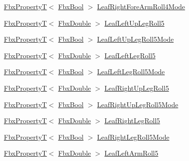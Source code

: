 \begin{DoxyCompactItemize}
\item 
\hyperlink{class_fbx_property_t}{Fbx\+PropertyT}$<$ \hyperlink{fbxtypes_8h_a92e0562b2fe33e76a242f498b362262e}{Fbx\+Bool} $>$ \hyperlink{class_fbx_character_a47514db9e67e2b8cf737977951edd431}{Leaf\+Right\+Fore\+Arm\+Roll4\+Mode}
\item 
\hyperlink{class_fbx_property_t}{Fbx\+PropertyT}$<$ \hyperlink{fbxtypes_8h_a171e72a1c46fc15c1a6c9c31948c1c5b}{Fbx\+Double} $>$ \hyperlink{class_fbx_character_a648cfd7497935a537ca77e015c87ab08}{Leaf\+Left\+Up\+Leg\+Roll5}
\item 
\hyperlink{class_fbx_property_t}{Fbx\+PropertyT}$<$ \hyperlink{fbxtypes_8h_a92e0562b2fe33e76a242f498b362262e}{Fbx\+Bool} $>$ \hyperlink{class_fbx_character_ae7b3e26b751dd9d4f69062a4541e4e0c}{Leaf\+Left\+Up\+Leg\+Roll5\+Mode}
\item 
\hyperlink{class_fbx_property_t}{Fbx\+PropertyT}$<$ \hyperlink{fbxtypes_8h_a171e72a1c46fc15c1a6c9c31948c1c5b}{Fbx\+Double} $>$ \hyperlink{class_fbx_character_aaacb001144169bc23af82338a4908f9f}{Leaf\+Left\+Leg\+Roll5}
\item 
\hyperlink{class_fbx_property_t}{Fbx\+PropertyT}$<$ \hyperlink{fbxtypes_8h_a92e0562b2fe33e76a242f498b362262e}{Fbx\+Bool} $>$ \hyperlink{class_fbx_character_a665e7a11aece9fedc4f101c62dd068b1}{Leaf\+Left\+Leg\+Roll5\+Mode}
\item 
\hyperlink{class_fbx_property_t}{Fbx\+PropertyT}$<$ \hyperlink{fbxtypes_8h_a171e72a1c46fc15c1a6c9c31948c1c5b}{Fbx\+Double} $>$ \hyperlink{class_fbx_character_a721b30be79d830818b6402e68352731a}{Leaf\+Right\+Up\+Leg\+Roll5}
\item 
\hyperlink{class_fbx_property_t}{Fbx\+PropertyT}$<$ \hyperlink{fbxtypes_8h_a92e0562b2fe33e76a242f498b362262e}{Fbx\+Bool} $>$ \hyperlink{class_fbx_character_aeed7584d8c5086b9b3deff24abd30b14}{Leaf\+Right\+Up\+Leg\+Roll5\+Mode}
\item 
\hyperlink{class_fbx_property_t}{Fbx\+PropertyT}$<$ \hyperlink{fbxtypes_8h_a171e72a1c46fc15c1a6c9c31948c1c5b}{Fbx\+Double} $>$ \hyperlink{class_fbx_character_a008a02d8cc33a281a0ffc947a20e5cb1}{Leaf\+Right\+Leg\+Roll5}
\item 
\hyperlink{class_fbx_property_t}{Fbx\+PropertyT}$<$ \hyperlink{fbxtypes_8h_a92e0562b2fe33e76a242f498b362262e}{Fbx\+Bool} $>$ \hyperlink{class_fbx_character_a91f415ab396f861adcfbe5468514d7ec}{Leaf\+Right\+Leg\+Roll5\+Mode}
\item 
\hyperlink{class_fbx_property_t}{Fbx\+PropertyT}$<$ \hyperlink{fbxtypes_8h_a171e72a1c46fc15c1a6c9c31948c1c5b}{Fbx\+Double} $>$ \hyperlink{class_fbx_character_afcd2329e11115fd6a891e64a4fe0ba8d}{Leaf\+Left\+Arm\+Roll5}

\end{DoxyCompactItemize}

